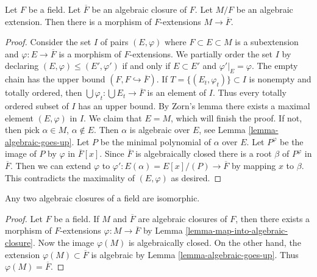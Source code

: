 \begin{lemma}
\label{lemma-map-into-algebraic-closure}
Let $F$ be a field. Let $\overline{F}$ be an algebraic closure of $F$.
Let $M/F$ be an algebraic extension. Then there is a morphism of
$F$-extensions $M \to \overline{F}$.
\end{lemma}

\begin{proof}
Consider the set $I$ of pairs $(E, \varphi)$ where $F \subset E \subset M$
is a subextension and $\varphi : E \to \overline{F}$ is a morphism of
$F$-extensions. We partially order the set $I$ by declaring
$(E, \varphi) \leq (E', \varphi')$ if and only if $E \subset E'$ and
$\varphi'|_E = \varphi$. The empty chain has the upper bound
$(F, F \hookrightarrow \overline{F})$. If
$T = \{(E_t, \varphi_t)\} \subset I$ is nonempty and
totally ordered, then
$\bigcup \varphi_t : \bigcup E_t \to \overline{F}$ is an element of $I$.
Thus every totally ordered subset of $I$ has an upper bound.
By Zorn's lemma there exists a maximal element $(E, \varphi)$ in $I$.
We claim that $E = M$, which will finish the proof. If not, then
pick $\alpha \in M$, $\alpha \not \in E$. Then $\alpha$ is algebraic
over $E$, see Lemma \ref{lemma-algebraic-goes-up}.
Let $P$ be the minimal polynomial of $\alpha$ over $E$.
Let $P^\varphi$ be the image of $P$ by $\varphi$ in $\overline{F}[x]$.
Since $\overline{F}$ is algebraically closed there is a root $\beta$
of $P^\varphi$ in $\overline{F}$. Then we can extend $\varphi$ to
$\varphi' : E(\alpha) = E[x]/(P) \to \overline{F}$ by mapping
$x$ to $\beta$. This contradicts the maximality of $(E, \varphi)$
as desired.
\end{proof}

\begin{lemma}
\label{lemma-algebraic-closures-isomorphic}
Any two algebraic closures of a field are isomorphic.
\end{lemma}

\begin{proof}
Let $F$ be a field. If $M$ and $\overline{F}$ are algebraic closures of
$F$, then there exists a morphism of $F$-extensions
$\varphi : M \to \overline{F}$ by
Lemma \ref{lemma-map-into-algebraic-closure}.
Now the image $\varphi(M)$ is algebraically closed.
On the other hand, the extension $\varphi(M) \subset \overline{F}$
is algebraic by Lemma \ref{lemma-algebraic-goes-up}.
Thus $\varphi(M) = \overline{F}$.
\end{proof}





